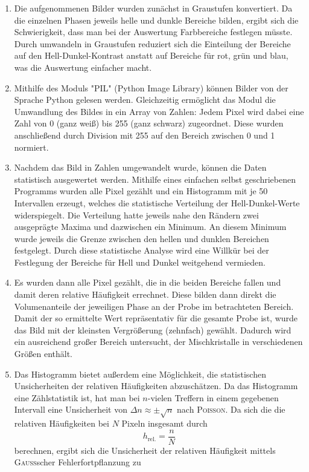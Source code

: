 \documentclass[german,  %
parskip=full,  %
]{scrartcl}
\begin{document}
\begin{enumerate}
\item Die aufgenommenen Bilder wurden zunächst in Graustufen konvertiert. Da die einzelnen Phasen jeweils helle und dunkle Bereiche bilden, ergibt sich die Schwierigkeit, dass man bei der Auswertung Farbbereiche festlegen müsste. Durch umwandeln in Graustufen reduziert sich die Einteilung der Bereiche auf den Hell-Dunkel-Kontrast anstatt auf Bereiche für rot, grün und blau, was die Auswertung einfacher macht.
\item Mithilfe des Moduls "PIL" (Python Image Library) können Bilder von der Sprache Python gelesen werden. Gleichzeitig ermöglicht das Modul die Umwandlung des Bildes in ein Array von Zahlen: Jedem Pixel wird dabei eine Zahl von 0 (ganz weiß) bis 255 (ganz schwarz) zugeordnet. Diese wurden anschließend durch Division mit 255 auf den Bereich zwischen 0 und 1 normiert.
\item Nachdem das Bild in Zahlen umgewandelt wurde, können die Daten statistisch ausgewertet werden. Mithilfe eines einfachen selbst geschriebenen Programms wurden alle Pixel gezählt und ein Histogramm mit je 50 Intervallen erzeugt, welches die statistische Verteilung der Hell-Dunkel-Werte widerspiegelt. Die Verteilung hatte jeweils nahe den Rändern zwei ausgeprägte Maxima und dazwischen ein Minimum. An diesem Minimum wurde jeweils die Grenze zwischen den hellen und dunklen Bereichen festgelegt. Durch diese statistische Analyse wird eine Willkür bei der Festlegung der Bereiche für Hell und Dunkel weitgehend vermieden.
\item Es wurden dann alle Pixel gezählt, die in die beiden Bereiche fallen und damit deren relative Häufigkeit errechnet. Diese bilden dann direkt die Volumenanteile der jeweiligen Phase an der Probe im betrachteten Bereich. Damit der so ermittelte Wert repräsentativ für die gesamte Probe ist, wurde das Bild mit der kleinsten Vergrößerung (zehnfach) gewählt. Dadurch wird ein ausreichend großer Bereich untersucht, der Mischkristalle in verschiedenen Größen enthält.
\item Das Histogramm bietet außerdem eine Möglichkeit, die statistischen Unsicherheiten der relativen Häufigkeiten abzuschätzen. Da das Histogramm eine Zählstatistik ist, hat man bei \(n\)-vielen Treffern in einem gegebenen Intervall eine Unsicherheit von \(\Delta n \approx \pm\sqrt{n}\) nach \textsc{Poisson}. Da sich die die relativen Häufigkeiten bei \(N\) Pixeln insgesamt durch 
\[h_{\mathrm{rel.}} = \frac{n}{N}\] 
berechnen, ergibt sich die Unsicherheit der relativen Häufigkeit mittels \textsc{Gauß}scher Fehlerfortpflanzung zu

\end{enumerate}
\end{document}
